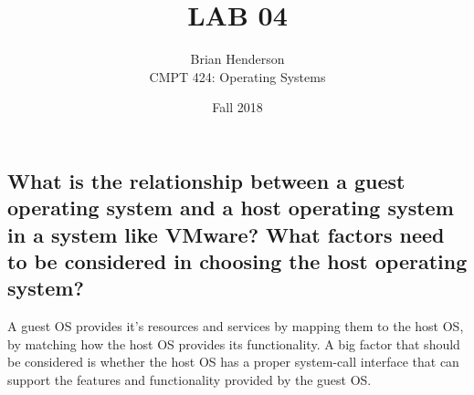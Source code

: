 \documentclass[12pt]{article}
\begin{document}
   \date{Fall 2018}
    
   \title{LAB 04	}
   \author{Brian Henderson \\ 
         CMPT 424: Operating Systems}
   \maketitle
   
   \subsection*{What is the relationship between a guest operating system and a host operating system in a system like VMware? What factors need to be considered in choosing the host operating system?}
   
   A guest OS provides it's resources and services by mapping them to the host OS, by matching how the host OS provides its functionality. A big factor that should be considered is whether the host OS has a proper system-call interface that can support the features and functionality provided by the guest OS.
   
    
   
\end{document}
